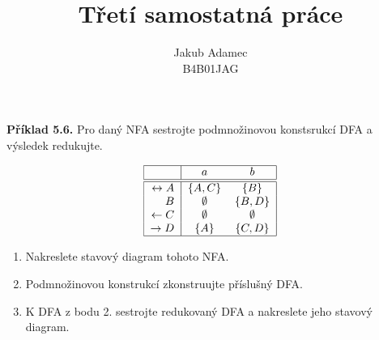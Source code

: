 \documentclass[11pt]{article}
\begin{document}

\newcommand\splitpage[2]{
      \begin{minipage}[t]{0.45\textwidth}#1
      \end{minipage}%
      \hfill
      \begin{minipage}[t]{0.45\textwidth}#2
      \end{minipage}
  }
 
 
\title{\textbf{Třetí samostatná práce}}%
\author{Jakub Adamec\\ %
B4B01JAG} %

\maketitle

\textbf{Příklad 5.6.} Pro daný NFA sestrojte podmnožinovou konstsrukcí DFA a výsledek redukujte.

\[
    \begin{tabular}{|r|c c|}
        \hline
        & $a$ & $b$\\
        \hline
        \hline
        $\leftrightarrow A$ & $\{A, C\}$ & $\{B\}$\\
        $B$ & $\emptyset$ & $\{B, D\}$\\
        $\leftarrow C$ & $\emptyset$ & $\emptyset$\\
        $\rightarrow D$ & $\{A\}$ & $\{C, D\}$\\
        \hline
    \end{tabular}
\]

\begin{enumerate}
    \item Nakreslete stavový diagram tohoto NFA.
    \item Podmnožinovou konstrukcí zkonstruujte příslušný DFA.
    \item K DFA z bodu 2. sestrojte redukovaný DFA a nakreslete jeho stavový diagram.
\end{enumerate}
\end{document}
